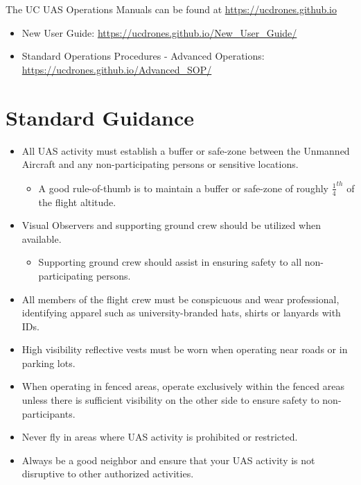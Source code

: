 \documentclass[
]{book}
\makeatletter
\providecommand{\tightlist}{%
  \setlength{\itemsep}{0pt}\setlength{\parskip}{0pt}}
\let\origdoublepage\cleardoublepage
\newcommand{\clearemptydoublepage}{\clearpage{\pagestyle{empty}\origdoublepage}}
\let\cleardoublepage\clearemptydoublepage
\renewcommand\part{%
   \if@openright
     \cleardoublepage
   \else
     \clearpage
   \fi
   \thispagestyle{empty}%
   \if@twocolumn
     \onecolumn
     \@tempswatrue
   \else
     \@tempswafalse
   \fi
   \null\vfil
   \secdef\@part\@spart}
\makeatother
\begin{document}
The UC UAS Operations Manuals can be found at \url{https://ucdrones.github.io}

\begin{itemize}
\tightlist
\item
  New User Guide: \url{https://ucdrones.github.io/New_User_Guide/}
\item
  Standard Operations Procedures - Advanced Operations: \url{https://ucdrones.github.io/Advanced_SOP/}
\end{itemize}

\hypertarget{part-uc-operating-standards}{%
\part{UC Operating Standards}\label{part-uc-operating-standards}}

\hypertarget{standard-guidance}{%
\chapter{Standard Guidance}\label{standard-guidance}}

\begin{itemize}
\tightlist
\item
  All UAS activity must establish a buffer or safe-zone between the Unmanned Aircraft and any non-participating persons or sensitive locations.

  \begin{itemize}
  \tightlist
  \item
    A good rule-of-thumb is to maintain a buffer or safe-zone of roughly \(\frac{1}{4}^{th}\) of the flight altitude.
  \end{itemize}
\item
  Visual Observers and supporting ground crew should be utilized when available.

  \begin{itemize}
  \tightlist
  \item
    Supporting ground crew should assist in ensuring safety to all non-participating persons.
  \end{itemize}
\item
  All members of the flight crew must be conspicuous and wear professional, identifying apparel such as university-branded hats, shirts or lanyards with IDs.
\item
  High visibility reflective vests must be worn when operating near roads or in parking lots.\\
\item
  When operating in fenced areas, operate exclusively within the fenced areas unless there is sufficient visibility on the other side to ensure safety to non-participants.
\item
  Never fly in areas where UAS activity is prohibited or restricted.
\item
  Always be a good neighbor and ensure that your UAS activity is not disruptive to other authorized activities.
\end{itemize}
\end{document}

